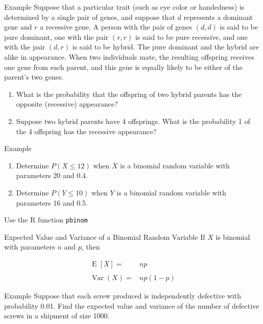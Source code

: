 \documentclass{beamer}
\newcommand{\E}{\operatorname{E}}
\newcommand{\Var}{\operatorname{Var}}
\begin{document}
\begin{frame}[t,shrink=20]{Example}
  Suppose that a particular trait (such as eye color or handedness) is
  determined by a single pair of genes, and suppose that $d$ represents a
  dominant gene and $r$ a recessive gene. A person with the pair of genes
  $(d, d)$ is said to be pure dominant, one with the pair $(r, r)$ is said to be
  pure recessive, and one with the pair $(d, r)$ is said to be hybrid. The pure
  dominant and the hybrid are alike in appearance. When two individuals mate,
  the resulting offspring receives one gene from each parent, and this gene is
  equally likely to be either of the parent’s two genes.
  \begin{enumerate}
  \item What is the probability that the offspring of two hybrid parents has the
    opposite (recessive) appearance?
  \item Suppose two hybrid parents have 4 offsprings. What is the probability 1
    of the 4 offspring has the recessive appearance?
  \end{enumerate}
\end{frame}

\begin{frame}[t]{Example}
  \begin{enumerate}
  \item Determine $P(X \leq 12)$ when $X$ is a binomial random variable with
    parameters 20 and 0.4.
  \item Determine $P(Y \leq 10)$ when $Y$ is a binomial random variable with
    parameters 16 and 0.5.
  \end{enumerate}
  Use the R function \texttt{pbinom}
\end{frame}

\begin{frame}{Expected Value and Variance of a Binomial Random Variable}
  If $X$ is binomial with parameters $n$ and $p$, then

  \begin{align*}
    \E[X] =& np\\
    \\
    \Var(X) =& np(1 - p)
  \end{align*}

\end{frame}

\begin{frame}[t]{Example}
  Suppose that each screw produced is independently defective with probability
  0.01. Find the expected value and variance of the number of defective screws
  in a shipment of size 1000.
\end{frame}
\end{document}

